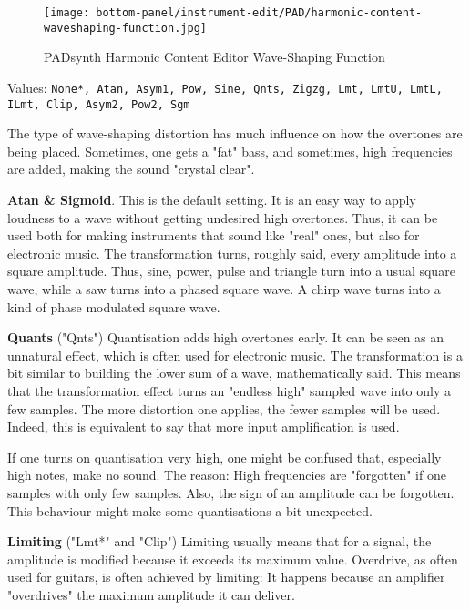 \begin{figure}[H]
   \centering
   \texttt{[image: bottom-panel/instrument-edit/PAD/harmonic-content-waveshaping-function.jpg]}
   \caption{PADsynth Harmonic Content Editor Wave-Shaping Function}
   \label{fig:padsynth_harmonic_content_editor_waveshaping_function}
\end{figure}

   Values: \texttt{None*, Atan, Asym1, Pow, Sine, Qnts, Zigzg, Lmt,
              LmtU, LmtL, ILmt, Clip, Asym2, Pow2, Sgm}

   The type of wave-shaping distortion has much influence on how the
   overtones are being placed. Sometimes, one gets a "fat" bass, and
   sometimes, high frequencies are added, making the sound "crystal clear".

   \textbf{Atan \& Sigmoid}.
   This is the default setting. It is an easy way to apply loudness to a wave
   without getting undesired high overtones. Thus, it can be used both for
   making instruments that sound like "real" ones, but also for electronic
   music. The transformation turns, roughly said, every amplitude into a
   square amplitude. Thus, sine, power, pulse and triangle turn into a usual
   square wave, while a saw turns into a phased square wave. A chirp wave
   turns into a kind of phase modulated square wave.

   \textbf{Quants} ("Qnts")
   Quantisation adds high overtones early. It can be seen as an unnatural
   effect, which is often used for electronic music.  The transformation is a
   bit similar to building the lower sum of a wave, mathematically said. This
   means that the transformation effect turns an "endless high" sampled
   wave into only a few samples. The more distortion one applies, the fewer
   samples will be used. Indeed, this is equivalent to say that more input
   amplification is used.


   If one turns on quantisation very high, one might be confused that,
   especially high notes, make no sound. The reason: High frequencies are
   "forgotten" if one samples with only few samples. Also, the sign of an
   amplitude can be forgotten. This behaviour might make some quantisations a
   bit unexpected.

   \textbf{Limiting} ("Lmt*" and "Clip")
   Limiting usually means that for a signal, the amplitude is modified
   because it exceeds its maximum value. Overdrive, as often used for
   guitars, is often achieved by limiting: It happens because an amplifier
   "overdrives" the maximum amplitude it can deliver.

